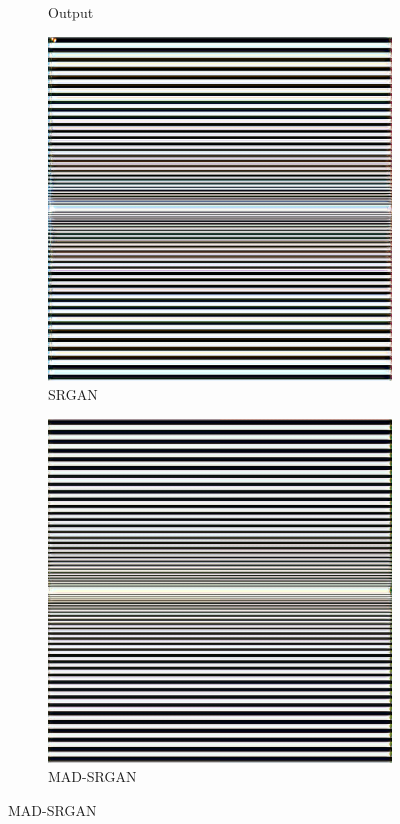 \documentclass[12pt,a4paper]{article}
\begin{document}
\begin{figure}[H]
\begin{subfigure}{0.2\textwidth}
                \caption*{Output}
            \end{subfigure}
            \enspace
            \begin{subfigure}{0.2\textwidth}
                \includegraphics[width=\textwidth]{images/samples/aliasing-1-srgan.png}
                \caption*{SRGAN}
            \end{subfigure}
            \enspace
            \begin{subfigure}{0.2\textwidth}
                \includegraphics[width=\textwidth]{images/samples/aliasing-1-mad-srgan.png}
                \caption*{MAD-SRGAN}
            \end{subfigure}
        \end{figure}
\end{document}
